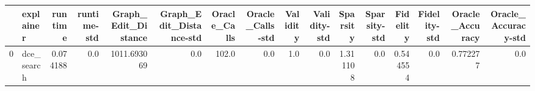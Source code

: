 \begin{tabular}{llrrrrrrrrrrrrrr}
\toprule
{} &   explainer &   runtime &  runtime-std &  Graph\_Edit\_Distance &  Graph\_Edit\_Distance-std &  Oracle\_Calls &  Oracle\_Calls-std &  Validity &  Validity-std &  Sparsity &  Sparsity-std &  Fidelity &  Fidelity-std &  Oracle\_Accuracy &  Oracle\_Accuracy-std \\
\midrule
0 &  dce\_search &  0.074188 &          0.0 &          1011.693069 &                      0.0 &         102.0 &               0.0 &       1.0 &           0.0 &  1.311108 &           0.0 &  0.544554 &           0.0 &         0.772277 &                  0.0 \\
\bottomrule
\end{tabular}
